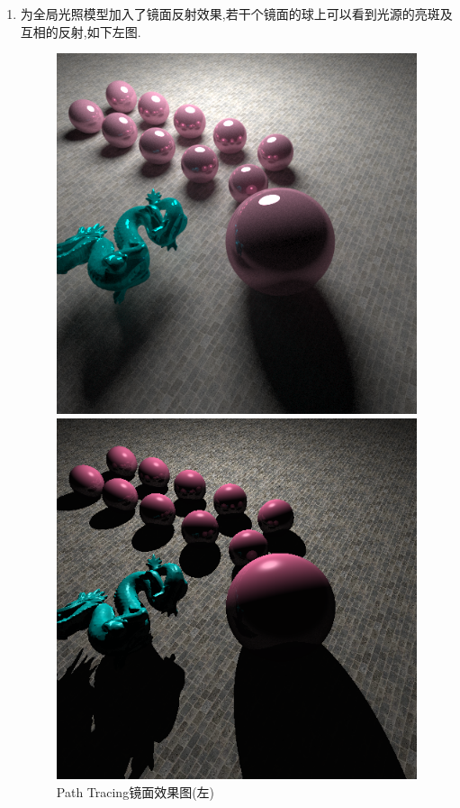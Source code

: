 \begin{enumerate}
  \item 为全局光照模型加入了镜面反射效果,若干个镜面的球上可以看到光源的亮斑及互相的反射,如下左图.
    \begin{figure}[H]
      \begin{minipage}[b]{0.48\linewidth}
        \centering
        \includegraphics[width=\textwidth]{img/gllu_refl.png}
      \end{minipage}
      \begin{minipage}[b]{0.48\linewidth}
        \centering
        \includegraphics[width=\textwidth]{img/compare_refl_phong.png}
      \end{minipage}
      \caption{Path Tracing镜面效果图(左)\label{fig:pt_refl}}
    \end{figure}


\end{enumerate}
